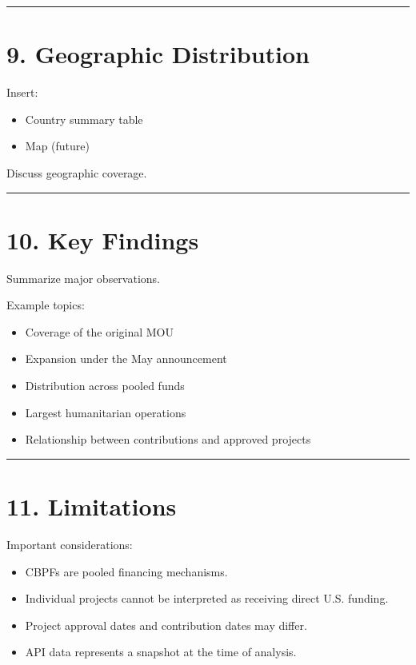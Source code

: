 \documentclass[
  11pt,
  letterpaper,
  DIV=11,
  numbers=noendperiod]{scrartcl}
\providecommand{\tightlist}{%
  \setlength{\itemsep}{0pt}\setlength{\parskip}{0pt}}
\begin{document}
\begin{center}\rule{0.5\linewidth}{0.5pt}\end{center}

\section{9. Geographic Distribution}\label{geographic-distribution}

Insert:

\begin{itemize}
\tightlist
\item
  Country summary table
\item
  Map (future)
\end{itemize}

Discuss geographic coverage.

\begin{center}\rule{0.5\linewidth}{0.5pt}\end{center}

\section{10. Key Findings}\label{key-findings}

Summarize major observations.

Example topics:

\begin{itemize}
\tightlist
\item
  Coverage of the original MOU
\item
  Expansion under the May announcement
\item
  Distribution across pooled funds
\item
  Largest humanitarian operations
\item
  Relationship between contributions and approved projects
\end{itemize}

\begin{center}\rule{0.5\linewidth}{0.5pt}\end{center}

\section{11. Limitations}\label{limitations}

Important considerations:

\begin{itemize}
\tightlist
\item
  CBPFs are pooled financing mechanisms.
\item
  Individual projects cannot be interpreted as receiving direct U.S.
  funding.
\item
  Project approval dates and contribution dates may differ.
\item
  API data represents a snapshot at the time of analysis.
\end{itemize}
\end{document}
